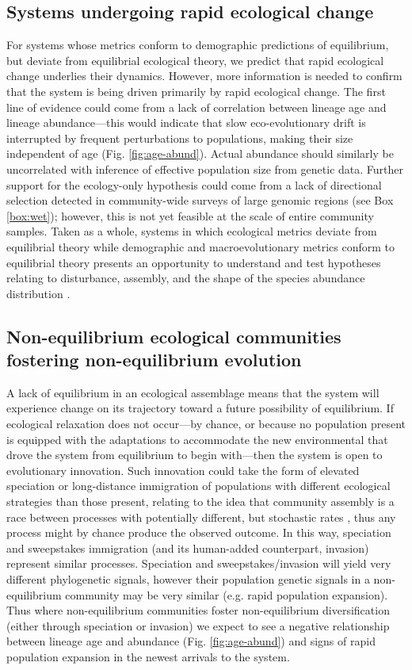 \documentclass[12pt]{article}
\newcounter{Box}
\begin{document}
\subsection{Systems undergoing rapid ecological change}

For systems whose metrics conform to demographic predictions of
equilibrium, but deviate from equilibrial ecological theory, we
predict that rapid ecological change underlies their
dynamics. However, more information is needed to confirm that the
system is being driven primarily by rapid ecological change. The first
line of evidence could come from a lack of correlation between lineage
age and lineage abundance---this would indicate that slow
eco-evolutionary drift is interrupted by frequent perturbations to
populations, making their size independent of age
(Fig. \ref{fig:age-abund}). Actual abundance should similarly be
uncorrelated with inference of effective population size from genetic
data. Further support for the ecology-only hypothesis could come from
a lack of directional selection detected in community-wide surveys of
large genomic regions (see Box \ref{box:wet}); however, this is not
yet feasible at the scale of entire community samples. Taken as a
whole, systems in which ecological metrics deviate from equilibrial
theory while demographic and macroevolutionary metrics conform to
equilibrial theory presents an opportunity to understand and test
hypotheses relating to disturbance, assembly, and the shape of the
species abundance distribution \citep[e.g.,][]{Harte2011-um}.

\subsection{Non-equilibrium ecological communities fostering non-equilibrium evolution}

A lack of equilibrium in an ecological assemblage means that the
system will experience change on its trajectory toward a future
possibility of equilibrium. If ecological relaxation does not
occur---by chance, or because no population present is equipped with
the adaptations to accommodate the new environmental that drove the
system from equilibrium to begin with---then the system is open to
evolutionary innovation.  Such innovation could take the form of
elevated speciation or long-distance immigration of populations with
different ecological strategies than those present, relating to the
idea that community assembly is a race between processes with
potentially different, but stochastic rates \citep{Vanoverbeke2015-ym},
thus any process might by chance produce the observed outcome. In this
way, speciation and sweepstakes immigration (and its human-added
counterpart, invasion) represent similar processes. Speciation and
sweepstakes/invasion will yield very different phylogenetic signals,
however their population genetic signals in a non-equilibrium
community may be very similar (e.g. rapid population expansion). Thus
where non-equilibrium communities foster non-equilibrium
diversification (either through speciation or invasion) we expect to
see a negative relationship between lineage age and abundance (Fig.
\ref{fig:age-abund}) and signs of rapid population expansion in the
newest arrivals to the system.
\end{document}
